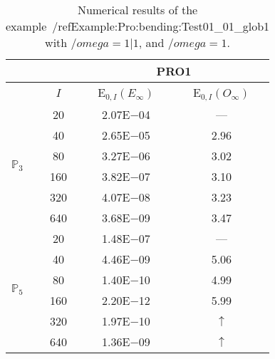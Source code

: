 \begin{table}[H]
\caption{Numerical results of the example~/ref{Example:Pro:bending:Test01_01_glob1} with $/omega=1|1$, and $/omega=1$.}
\setlength{\tabcolsep}{5pt}
\centering
\begin{tabular}{@{}l c c c@{}}
\toprule
 &  & \multicolumn{2}{c}{PRO1}\\
\midrule
 & $I$ & E$_{0,I}(E_{\infty})$ & E$_{0,I}(O_{\infty})$\\
\midrule
\multirow{6}{*}{$\mathbb{P}_{3}$}
 & 20 & 2.07E$-$04 & ---\\
 & 40 & 2.65E$-$05 & 2.96\\
 & 80 & 3.27E$-$06 & 3.02\\
 & 160 & 3.82E$-$07 & 3.10\\
 & 320 & 4.07E$-$08 & 3.23\\
 & 640 & 3.68E$-$09 & 3.47\\
\midrule
\multirow{6}{*}{$\mathbb{P}_{5}$}
 & 20 & 1.48E$-$07 & ---\\
 & 40 & 4.46E$-$09 & 5.06\\
 & 80 & 1.40E$-$10 & 4.99\\
 & 160 & 2.20E$-$12 & 5.99\\
 & 320 & 1.97E$-$10 & $\uparrow$\\
 & 640 & 1.36E$-$09 & $\uparrow$\\
\bottomrule
\end{tabular}
\label{Table:PRO:test_01_01_test3_pro1}
\end{table}
